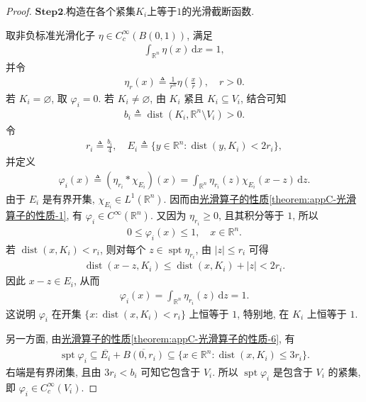 \documentclass[../../main.tex]{subfiles}
\begin{document}
\begin{proof}
\noindent$\mathbf{Step}\mathbf{2}.${\heiti 构造在各个紧集$K_i$上等于$1$的光滑截断函数.}

取非负标准光滑化子 $\eta\in C_c^\infty(B(0,1))$, 满足
\begin{align*}
\int_{\mathbb{R}^{n}}\eta(x)\,\mathrm{d}x=1,
\end{align*}
并令
\begin{align*}
\eta_r(x)\triangleq\frac{1}{r^{n}}\eta\left(\frac{x}{r}\right),\quad r>0.
\end{align*}
若 $K_i=\varnothing$, 取 $\varphi_i=0$. 若 $K_i\neq\varnothing$, 由 $K_i$ 紧且 $K_i\subseteq V_i$, 结合可知
\begin{align*}
b_i\triangleq\operatorname{dist}(K_i,\mathbb{R}^{n}\setminus V_i)>0.
\end{align*}
令
\begin{align*}
r_i\triangleq\frac{b_i}{4},\quad
E_i\triangleq\{y\in\mathbb{R}^{n}:\operatorname{dist}(y,K_i)<2r_i\},
\end{align*}
并定义
\begin{align*}
\varphi_i(x)\triangleq(\eta_{r_i}*\chi_{E_i})(x)
=\int_{\mathbb{R}^{n}}\eta_{r_i}(z)\chi_{E_i}(x-z)\,\mathrm{d}z.
\end{align*}
由于 $E_i$ 是有界开集, $\chi_{E_i}\in L^1(\mathbb{R}^{n})$. 因而由\hyperref[theorem:appC-光滑算子的性质]{光滑算子的性质\ref{theorem:appC-光滑算子的性质-1}}, 有 $\varphi_i\in C^\infty(\mathbb{R}^{n})$. 又因为 $\eta_{r_i}\geqslant0$, 且其积分等于 $1$, 所以
\begin{align*}
0\leqslant\varphi_i(x)\leqslant1,\quad x\in\mathbb{R}^{n}.
\end{align*}
若 $\operatorname{dist}(x,K_i)<r_i$, 则对每个 $z\in\operatorname{spt}\eta_{r_i}$, 由 $|z|\leqslant r_i$ 可得
\begin{align*}
\operatorname{dist}(x-z,K_i)
\leqslant\operatorname{dist}(x,K_i)+|z|
<2r_i.
\end{align*}
因此 $x-z\in E_i$, 从而
\begin{align*}
\varphi_i(x)
=\int_{\mathbb{R}^{n}}\eta_{r_i}(z)\,\mathrm{d}z
=1.
\end{align*}
这说明 $\varphi_i$ 在开集 $\{x:\operatorname{dist}(x,K_i)<r_i\}$ 上恒等于 $1$, 特别地, 在 $K_i$ 上恒等于 $1$.

另一方面, 由\hyperref[theorem:appC-光滑算子的性质-6]{光滑算子的性质\ref{theorem:appC-光滑算子的性质-6}}, 有
\begin{align*}
\operatorname{spt}\varphi_i
\subseteq\overline{E_i}+\overline{B(0,r_i)}
\subseteq\{x\in\mathbb{R}^{n}:\operatorname{dist}(x,K_i)\leqslant3r_i\}.
\end{align*}
右端是有界闭集, 且由 $3r_i<b_i$ 可知它包含于 $V_i$. 所以 $\operatorname{spt}\varphi_i$ 是包含于 $V_i$ 的紧集, 即 $\varphi_i\in C_c^\infty(V_i)$.


\end{proof}
\end{document}
